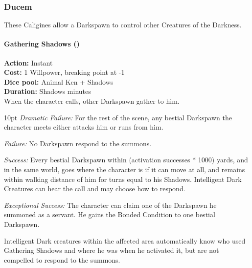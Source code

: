 \subsubsection*{Ducem}

These Caligines allow a Darkspawn to control other Creatures of the Darkness.\\

\paragraph*{Gathering Shadows (\textbullet\textbullet\textbullet\textbullet\textbullet)}

\noindent \textbf{Action:} Instant\\

\noindent \textbf{Cost:} 1 Willpower, breaking point at -1\\

\noindent \textbf{Dice pool:} Animal Ken + Shadows\\

\noindent \textbf{Duration:} Shadows minutes\\

When the character calls, other Darkspawn gather to him. \\

\begin{myindentpar}{10pt}    \emph{Dramatic Failure:} For the rest of the scene, any bestial Darkspawn the character meets either attacks him or runs from him.

    \emph{Failure:}  No Darkspawn respond to the summons.

    \emph{Success:}  Every bestial Darkspawn within (activation successes * 1000) yards, and in the same world, goes where the character is if it can move at all, and remains within walking distance of him for turns equal to his Shadows. Intelligent Dark Creatures can hear the call and may choose how to respond.

    \emph{Exceptional Success:} The character can claim one of the Darkspawn he summoned as a servant. He gains the Bonded Condition to one bestial Darkspawn.\\\end{myindentpar}

Intelligent Dark creatures within the affected area automatically know who used Gathering Shadows and where he was when he activated it, but are not compelled to respond to the summons.\\


